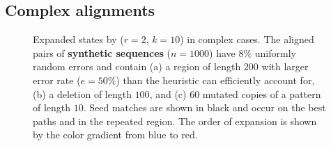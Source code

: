 \subsection{Complex alignments}\label{GLOBALsec:limitations}

\begin{figure}[t]
  \centering
  \caption[Expanded states for various complex cases]{Expanded states by \CSH
  ($r{=}2$, $k{=}10$) in complex cases. The aligned pairs of \textbf{synthetic
  sequences} ($n{=}1000$) have $8\%$ uniformly random errors and contain (a) a
  region of length $200$ with larger error rate ($e{=}50\%$) than the heuristic
  can efficiently account for, (b) a deletion of length $100$, and (c) $60$
  mutated copies of a pattern of length $10$. Seed matches are shown in black
  and occur on the best paths and in the repeated region. The order of expansion
  is shown by the color gradient from blue to red.}
  \label{GLOBALfig:limitations}
\end{figure}


